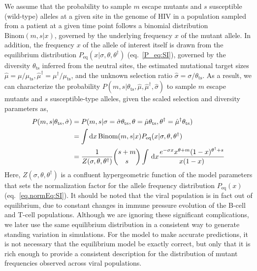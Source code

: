 \documentclass[11pt]{article}
\renewcommand{\d}{{\text d}}
\newcommand{\eq}{{\text{eq}}}
\newcommand{\ts}{{\text{ts}}}
\begin{document}
We assume that the probability to sample $m$ escape mutants and $s$ susceptible (wild-type) alleles at a given site  in the genome of  HIV in a   population sampled from a patient at a given time point follows a binomial distribution $\text{Binom}(m,s |x)$,  governed by the underlying  frequency  $x$ of the mutant allele. In addition, the frequency $x$ of the allele of interest  itself is drawn from the equilibrium distribution $P_\eq(x|\sigma,\theta,\theta^\dagger)$ (eq.~\ref{P_eq:SI}), governed by the diversity  $\theta_{\ts}$ inferred from the neutral sites, the estimated mutational target sizes $\hat{\mu} = \mu/\mu_{\ts}, \hat{\mu}^\dagger =  \mu^\dagger/\mu_{\ts}$, and the unknown selection ratio $\hat{\sigma} = \sigma/\theta_{\ts}$. As a result, we can characterize the probability $ P(m,s | \theta_{\ts} , \hat{\mu}, \hat{\mu}^\dagger, \hat{\sigma})$ to sample $m$ escape mutants and $s$ susceptible-type alleles, given the scaled selection and diversity parameters as,   
\begin{align}
\nonumber
P(m,s | \theta_\ts, \hat{\sigma} ) & = P(m,s | \sigma = \hat{\sigma} \theta_{\ts} , \theta = \hat{\mu} \theta_{\ts}, \theta^\dagger = \hat{\mu}^\dagger \theta_{\ts}) \\
\nonumber&= \int \d x\, \text{Binom}(m,s |x) P_\eq(x| \sigma, \theta, \theta^\dagger )\\
&=  \frac{1}{Z(\sigma,\theta,\theta^\dagger)} \binom{s+m}{s} \int \, \d x  \frac{e^{-\sigma x} x^{\theta + m} (1-x)^{\theta^\dagger+s}}{x(1-x)} \label{eq:Pmutwt_SI}
\end{align}
Here, $Z(\sigma,\theta,\theta^\dagger)$ is a confluent hypergeometric function of the model parameters that sets the normalization factor for the allele frequency distribution $P_\eq(x)$ (eq.~\ref{eq.normEq:SI}).
It should be noted that  the viral population is in fact out of equilibrium, due to constant changes in immune pressure evolution of the B-cell and T-cell populations. Although we are ignoring these significant complications, we later use the same equilibrium distribution in a consistent way to generate standing variation in simulations. For the model to make accurate predictions, it is not necessary that the equilibrium model be exactly correct,
	but only that it is rich enough to provide a consistent description for the distribution of mutant frequencies observed across viral populations.
\end{document}
